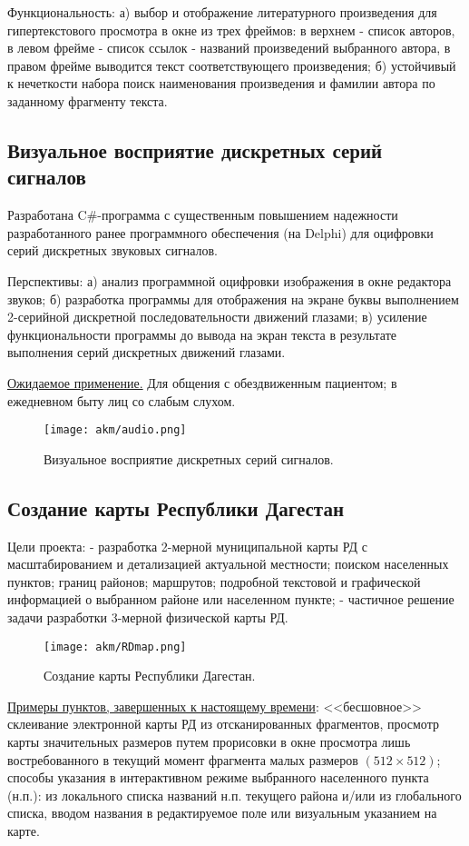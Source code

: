 Функциональность: а) выбор и отображение литературного произведения для гипертекстового просмотра в окне из трех фреймов: в верхнем - список авторов, в левом фрейме - список ссылок - названий произведений выбранного автора, в правом фрейме выводится текст соответствующего произведения;
б) устойчивый к нечеткости набора поиск наименования произведения и фамилии автора по заданному фрагменту текста.


\subsection{Визуальное восприятие дискретных серий сигналов}

Разработана C\#-программа с существенным повышением надежности разработанного ранее программного обеспечения (на Delphi) для оцифровки серий дискретных звуковых сигналов.

Перспективы: а) анализ программной оцифровки изображения в окне редактора звуков;
б) разработка программы для отображения на экране буквы выполнением 2-серийной дискретной последовательности движений глазами; в) усиление функциональности программы до вывода на экран текста в результате выполнения серий дискретных движений глазами.

\underline{Ожидаемое применение.}
Для общения с обездвиженным пациентом;  в ежедневном быту лиц со слабым слухом.
\begin{figure}[h]
    \begin{center}
        \texttt{[image: akm/audio.png]}
    \end{center}
    \caption*{Визуальное восприятие дискретных серий сигналов.}
\end{figure}


\subsection{Создание карты Республики Дагестан}

Цели проекта: - разработка 2-мерной муниципальной карты РД с масштабированием и детализацией актуальной местности; поиском населенных пунктов; границ районов; маршрутов; подробной текстовой и графической информацией о выбранном районе или населенном пункте; - частичное решение задачи разработки 3-мерной физической карты РД.
\begin{figure}[h]
    \begin{center}
        \texttt{[image: akm/RDmap.png]}
    \end{center}
    \caption*{Создание карты Республики Дагестан.}
\end{figure}
\underline{Примеры пунктов, завершенных к настоящему времени}: <<бесшовное>> склеивание электронной карты РД из отсканированных фрагментов,
просмотр карты значительных размеров путем прорисовки в окне просмотра лишь востребованного в текущий момент фрагмента малых размеров $(512\times 512)$; способы указания в интерактивном режиме выбранного населенного пункта (н.п.): из локального списка названий н.п. текущего района и/или из глобального списка, вводом названия в редактируемое поле или визуальным указанием на карте.



